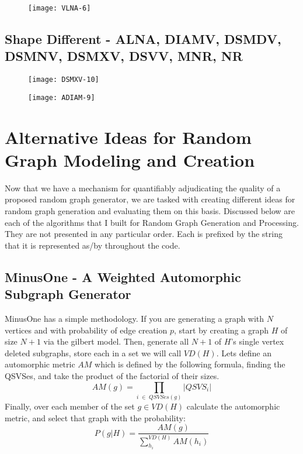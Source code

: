 \begin{figure}[h]
\label{fig:vlna6}
\caption{}
\centering
\texttt{[image: VLNA-6]}
\end{figure}


\subsection*{Shape Different - ALNA, DIAMV, DSMDV, DSMNV, DSMXV, DSVV, MNR, NR}

\begin{figure}[h]
\label{fig:dsmxv10}
\caption{}
\centering
\texttt{[image: DSMXV-10]}
\end{figure}

\begin{figure}[h]
\label{fig:adiam9}
\caption{}
\centering
\texttt{[image: ADIAM-9]}
\end{figure}


\section{Alternative Ideas for Random Graph Modeling and Creation}

Now that we have a mechanism for quantifiably adjudicating the quality of a proposed random graph generator, we are tasked with creating different ideas for random graph generation and evaluating them on this basis.
Discussed below are each of the algorithms that I built for Random Graph Generation and Processing.
They are not presented in any particular order.
Each is prefixed by the string that it is represented as/by throughout the code.

\subsection{MinusOne - A Weighted Automorphic Subgraph Generator}

MinusOne has a simple methodology.
If you are generating a graph with $N$ vertices and with probability of edge creation $p$, start by creating a graph $H$ of size $N+1$ via the gilbert model.
Then, generate all $N+1$ of $H$'s single vertex deleted subgraphs, store each in a set we will call $VD(H)$.
Lets define an automorphic metric $AM$ which is defined by the following formula, finding the QSVSes, and take the product of the factorial of their sizes.
$$AM(g) = \prod_{i \;\in \;QSVSes(g)} |QSVS_i|$$
Finally, over each member of the set $g \in VD(H)$ calculate the automorphic metric, and select that graph with the probability:
$$P(g | H) = \frac{AM(g)}{\sum_{h_i}^{VD(H)} AM(h_i)}$$

